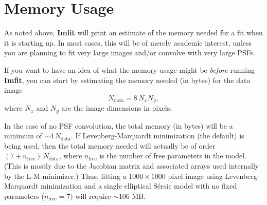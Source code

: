 \documentclass[10pt,a4paper,article]{memoir}
\newcommand{\imfit}{\textbf{Imfit}}
\begin{document}
\section{Memory Usage}

As noted above, \imfit{} will print an estimate of the memory needed for a fit
when it is starting up. In most cases, this will be of merely academic interest,
unless you are planning to fit very large images and/or convolve with very large PSFs.

If you want to have an idea of what the memory usage might be
\textit{before} running \imfit, you can start by estimating the memory needed (in bytes) for the
data image
\begin{equation}
N_{\mathrm{data}} = 8 \, N_{x} N_{y},
\end{equation}
where $N_{x}$ and $N_{y}$ are the image dimensions in pixels. 

In the case of no PSF convolution, the total memory (in bytes)
will be a minimum of $\sim 4 \, N_{\mathrm{data}}$. If Levenberg-Marquardt
minimization (the default) is being used, then the total memory needed
will actually be of order $(7 + n_{\mathrm{free}}) \, N_{\mathrm{data}}$, where
$n_{\mathrm{free}}$ is the number of free parameters in the model. (This is
mostly due to the Jacobian matrix and associated arrays used
internally by the L-M minimizer.) Thus, fitting a $1000 \times 1000$
pixel image using Levenberg-Marquardt minimization and a single
elliptical S\'ersic model with no fixed parameters ($n_{\mathrm{free}} = 7)$
will require $\sim 106$ MB.
\end{document}
